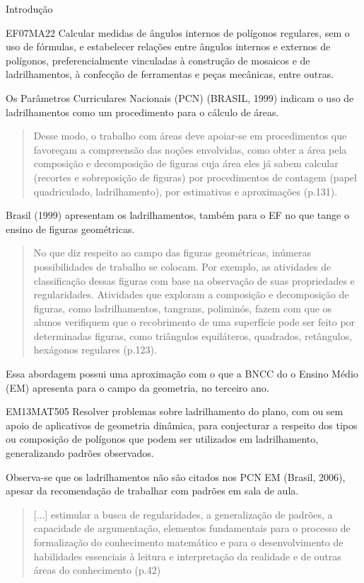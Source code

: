 \begin{apresentacao}{Introdução}
\begin{habilities}{EF07MA22} Calcular medidas de ângulos internos de polígonos regulares, sem o uso de fórmulas, e estabelecer relações entre ângulos internos e externos de polígonos, preferencialmente vinculadas à construção de mosaicos e de ladrilhamentos, à confecção de ferramentas e peças mecânicas, entre outras. 
\end{habilities}

Os Parâmetros Curriculares Nacionais (PCN) (BRASIL, 1999) indicam o uso de ladrilhamentos como um procedimento para o cálculo de áreas.
\begin{quote}
Desse modo, o trabalho com áreas deve apoiar-se em procedimentos que favoreçam a compreensão das noções envolvidas, como obter a área pela composição e decomposição de figuras cuja área eles já sabem calcular (recortes e sobreposição de figuras) por procedimentos de contagem (papel quadriculado, ladrilhamento), por estimativas e aproximações (p.131).
\end{quote}

Brasil (1999) apresentam os ladrilhamentos, também para o EF no que tange o ensino de figuras geométricas.
\begin{quote}
No que diz respeito ao campo das figuras geométricas, inúmeras possibilidades de trabalho se colocam. Por exemplo, as atividades de classificação dessas figuras com base na observação de suas propriedades e regularidades. Atividades que exploram a composição e decomposição de figuras, como ladrilhamentos, tangrans, poliminós, fazem com que os alunos verifiquem que o recobrimento de uma superfície pode ser feito por determinadas figuras, como triângulos equiláteros, quadrados, retângulos, hexágonos regulares (p.123).
\end{quote}

Essa abordagem possui uma aproximação com o que a BNCC do o Ensino Médio (EM) apresenta para o campo da geometria, no terceiro ano.


\begin{habilities}{EM13MAT505} 
Resolver problemas sobre ladrilhamento do plano, com ou sem apoio de aplicativos de geometria dinâmica, para conjecturar a respeito dos tipos ou composição de polígonos que podem ser utilizados em ladrilhamento, generalizando padrões observados.
\end{habilities}

Observa-se que os ladrilhamentos não são citados nos PCN EM (Brasil, 2006), apesar da recomendação de trabalhar com padrões em sala de aula. 
\begin{quote}
[...] estimular a busca de regularidades, a generalização de padrões, a capacidade de argumentação, elementos fundamentais para o processo de formalização do conhecimento matemático e para o desenvolvimento de habilidades essenciais à leitura e interpretação da realidade e de outras áreas do conhecimento (p.42)
\end{quote}


\end{apresentacao}
